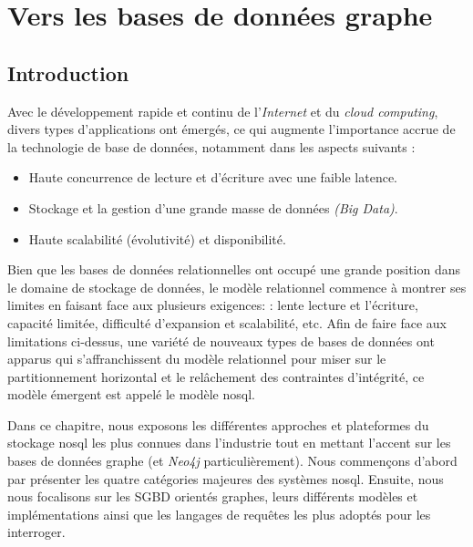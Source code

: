 \chapter{Vers les bases de données graphe}
\label{ch:graph-db}

\section*{Introduction}
 

Avec le développement rapide et continu de l'\textit{Internet} et du
\textit{cloud computing}, divers types d'applications ont émergés, ce
qui augmente l'importance accrue de la technologie de base de données,
notamment dans les aspects suivants \cite{han2011survey}:

\begin{itemize}\renewcommand\labelitemi{--}
\item Haute concurrence de lecture et d'écriture avec une faible
  latence.

\item Stockage et la gestion d'une grande masse de données \emph{(Big
    Data)}.

\item Haute scalabilité (évolutivité) et disponibilité.\medskip
\end{itemize}
\enddescription

Bien que les bases de données relationnelles ont occupé une grande
position dans le domaine de stockage de données, le modèle relationnel
commence à montrer ses limites en faisant face aux plusieurs
exigences: \cite{han2011survey}: lente lecture et l'écriture, capacité
limitée, difficulté d'expansion et scalabilité, etc. Afin de faire
face aux limitations ci-dessus, une variété de nouveaux types de bases
de données ont apparus qui s'affranchissent du modèle relationnel
pour miser sur le partitionnement horizontal et le relâchement des
contraintes d'intégrité, ce modèle émergent est appelé le modèle
\acrshort{nosql}.\medskip

Dans ce chapitre, nous exposons les différentes approches et
plateformes du stockage \acrshort{nosql} les plus connues dans
l'industrie tout en mettant l'accent sur les bases de données graphe
(et \emph{Neo4j} particulièrement). Nous commençons d'abord par
présenter les quatre catégories majeures des systèmes
\acrshort{nosql}. Ensuite, nous nous focalisons sur les \acrshort{SGBD}
orientés graphes, leurs différents modèles et implémentations ainsi
que les langages de requêtes les plus adoptés pour les interroger.

